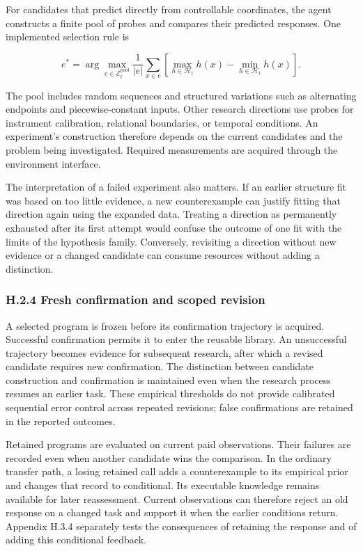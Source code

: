 \documentclass[twoside,11pt]{article}
\begin{document}
For candidates that predict directly from controllable coordinates, the agent constructs a finite pool of probes and compares their predicted responses. One implemented selection rule is


\[
e^*=\arg\max_{e\in\mathcal E_t^{\mathrm{pool}}}
\frac{1}{|e|}\sum_{x\in e}
\left[\max_{h\in\mathcal H_t}h(x)-\min_{h\in\mathcal H_t}h(x)\right].
\]


The pool includes random sequences and structured variations such as alternating endpoints and piecewise-constant inputs. Other research directions use probes for instrument calibration, relational boundaries, or temporal conditions. An experiment's construction therefore depends on the current candidates and the problem being investigated. Required measurements are acquired through the environment interface.


The interpretation of a failed experiment also matters. If an earlier structure fit was based on too little evidence, a new counterexample can justify fitting that direction again using the expanded data. Treating a direction as permanently exhausted after its first attempt would confuse the outcome of one fit with the limits of the hypothesis family. Conversely, revisiting a direction without new evidence or a changed candidate can consume resources without adding a distinction.


\subsubsection*{H.2.4 Fresh confirmation and scoped revision}

A selected program is frozen before its confirmation trajectory is acquired. Successful confirmation permits it to enter the reusable library. An unsuccessful trajectory becomes evidence for subsequent research, after which a revised candidate requires new confirmation. The distinction between candidate construction and confirmation is maintained even when the research process resumes an earlier task. These empirical thresholds do not provide calibrated sequential error control across repeated revisions; false confirmations are retained in the reported outcomes.


Retained programs are evaluated on current paid observations. Their failures are recorded even when another candidate wins the comparison. In the ordinary transfer path, a losing retained call adds a counterexample to its empirical prior and changes that record to conditional. Its executable knowledge remains available for later reassessment. Current observations can therefore reject an old response on a changed task and support it when the earlier conditions return. Appendix H.3.4 separately tests the consequences of retaining the response and of adding this conditional feedback.
\end{document}
